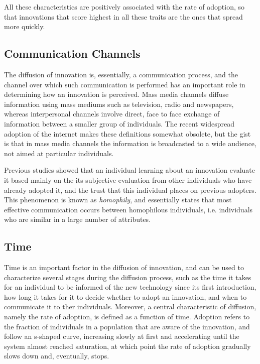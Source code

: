\documentclass[12pt]{article}
\begin{document}
All these characteristics are positively associated with the rate of adoption, so that innovations that score highest in all these traits are the ones that spread more quickly.

\subsection{Communication Channels}
\label{sec:orgc6ddb4c}
The diffusion of innovation is, essentially, a communication process, and the channel over which such communication is performed has an important role in determining how an innovation is perceived. Mass media channels diffuse information using mass mediums such as television, radio and newspapers, whereas interpersonal channels involve direct, face to face exchange of information between a smaller group of individuals. The recent widespread adoption of the internet makes these definitions somewhat obsolete, but the gist is that in mass media channels the information is broadcasted to a wide audience, not aimed at particular individuals.

Previous studies showed that an individual learning about an innovation evaluate it based mainly on the its subjective evaluation from other individuals who have already adopted it, and the trust that this individual places on previous adopters. This phenomenon is known as \emph{homophily}, and essentially states that most effective communication occurs between homophilous individuals, i.e. individuals who are similar in a large number of attributes.

\subsection{Time}
\label{sec:org5fd71cf}
Time is an important factor in the diffusion of innovation, and can be used to characterize several stages during the diffusion process, such as the time it takes for an individual to be informed of the new technology since its first introduction, how long it takes for it to decide whether to adopt an innovation, and when to communicate it to ther individuals. Moreover, a central characteristic of diffusion, namely the rate of adoption, is defined as a function of time. Adoption refers to the fraction of individuals in a population that are aware of the innovation, and follow an s-shaped curve, increasing slowly at first and accelerating until the system almost reached saturation, at which point the rate of adoption gradually slows down and, eventually, stops.
\end{document}
